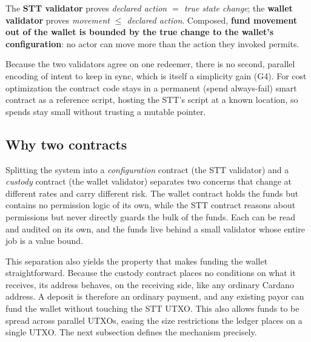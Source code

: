 \documentclass[11pt,DIV=11,parskip=half-]{scrartcl}
\begin{document}
\begin{guaranteebox}
The \textbf{STT validator} proves \emph{declared action $=$ true state change};
the \textbf{wallet validator} proves \emph{movement $\le$ declared action}.
Composed, \textbf{fund movement out of the wallet is bounded by the true change
to the wallet's configuration}: no actor can move more than the action they
invoked permits.
\end{guaranteebox}

\noindent Because the two validators agree on one redeemer, there is no second, parallel encoding of intent to keep in sync, which is itself a simplicity gain (G4). For cost optimization the contract code stays in a permanent (spend always-fail) smart contract as a reference script, hosting the STT's script at a known location, so spends stay small without trusting a mutable pointer.

\subsection{Why two contracts}
\label{sub:why-two}
Splitting the system into a \emph{configuration} contract (the STT validator) and a \emph{custody} contract (the wallet validator) separates two concerns that change at different rates and carry different risk. The wallet contract holds the funds but contains no permission logic of its own, while the STT contract reasons about permissions but never directly guards the bulk of the funds. Each can be read and audited on its own, and the funds live behind a small validator whose entire job is a value bound.

This separation also yields the property that makes funding the wallet straightforward. Because the custody contract places no conditions on what it receives, its address behaves, on the receiving side, like any ordinary Cardano address. A deposit is therefore an ordinary payment, and any existing payor can fund the wallet without touching the STT UTXO. This also allows funds to be spread across parallel UTXOs, easing the size restrictions the ledger places on a single UTXO. The next subsection defines the mechanism precisely.
\end{document}
